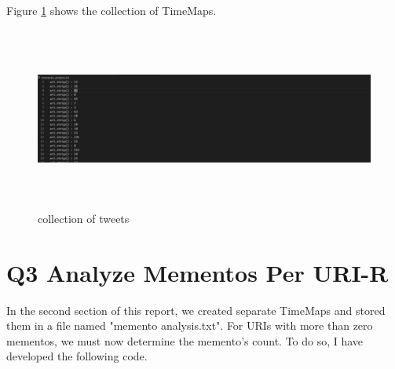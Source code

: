 \documentclass[12pt]{article}
\begin{document}
Figure \ref{fig:Memento Timemaps} shows the collection of TimeMaps.

\begin{figure}[h]
    \centering
    \includegraphics[trim=0 20 10 50, clip, width=\textwidth,height=6cm] {mementos.jpg}
    \caption{collection of tweets}
    \label{fig:Memento Timemaps}
\end{figure}

\section*{Q3 Analyze Mementos Per URI-R}
In the second section of this report, we created separate TimeMaps and stored them in a file named "memento analysis.txt". For URIs with more than zero mementos, we must now determine the memento's count. To do so, I have developed the following code.
\end{document}
